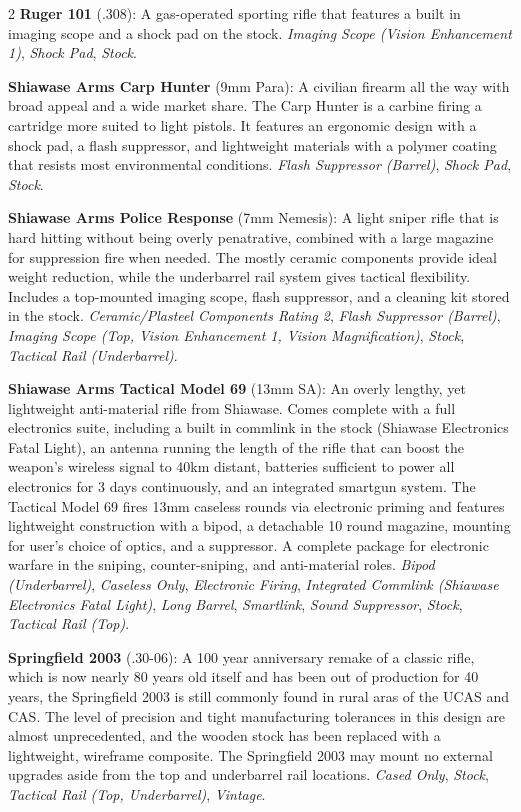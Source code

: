\documentclass[
  oneside]{article}
\begin{document}
\begin{multicols}{2}
\textbf{Ruger 101} (.308): A gas-operated sporting
rifle that features a built in imaging scope and a
shock pad on the stock. \emph{Imaging Scope
(Vision Enhancement 1)}, \emph{Shock Pad},
\emph{Stock}.

\textbf{Shiawase Arms Carp Hunter} (9mm Para): A
civilian firearm all the way with broad appeal and
a wide market share. The Carp Hunter is a carbine
firing a cartridge more suited to light pistols.
It features an ergonomic design with a shock pad,
a flash suppressor, and lightweight materials with
a polymer coating that resists most environmental
conditions. \emph{Flash Suppressor (Barrel)},
\emph{Shock Pad}, \emph{Stock}.

\textbf{Shiawase Arms Police Response} (7mm
Nemesis): A light sniper rifle that is hard
hitting without being overly penatrative, combined
with a large magazine for suppression fire when
needed. The mostly ceramic components provide
ideal weight reduction, while the underbarrel rail
system gives tactical flexibility. Includes a
top-mounted imaging scope, flash suppressor, and a
cleaning kit stored in the stock.
\emph{Ceramic/Plasteel Components Rating 2},
\emph{Flash Suppressor (Barrel)}, \emph{Imaging
Scope (Top, Vision Enhancement 1, Vision
Magnification)}, \emph{Stock}, \emph{Tactical Rail
(Underbarrel)}.

\textbf{Shiawase Arms Tactical Model 69} (13mm
SA): An overly lengthy, yet lightweight
anti-material rifle from Shiawase. Comes complete
with a full electronics suite, including a built
in commlink in the stock (Shiawase Electronics
Fatal Light), an antenna running the length of the
rifle that can boost the weapon's wireless signal
to 40km distant, batteries sufficient to power all
electronics for 3 days continuously, and an
integrated smartgun system. The Tactical Model 69
fires 13mm caseless rounds via electronic priming
and features lightweight construction with a
bipod, a detachable 10 round magazine, mounting
for user's choice of optics, and a suppressor. A
complete package for electronic warfare in the
sniping, counter-sniping, and anti-material roles.
\emph{Bipod (Underbarrel)}, \emph{Caseless Only},
\emph{Electronic Firing}, \emph{Integrated
Commlink (Shiawase Electronics Fatal Light)},
\emph{Long Barrel}, \emph{Smartlink}, \emph{Sound
Suppressor}, \emph{Stock}, \emph{Tactical Rail
(Top)}.

\textbf{Springfield 2003} (.30-06): A 100 year
anniversary remake of a classic rifle, which is
now nearly 80 years old itself and has been out of
production for 40 years, the Springfield 2003 is
still commonly found in rural aras of the UCAS and
CAS. The level of precision and tight
manufacturing tolerances in this design are almost
unprecedented, and the wooden stock has been
replaced with a lightweight, wireframe composite.
The Springfield 2003 may mount no external
upgrades aside from the top and underbarrel rail
locations. \emph{Cased Only}, \emph{Stock},
\emph{Tactical Rail (Top, Underbarrel)},
\emph{Vintage}.


\end{multicols}
\end{document}
